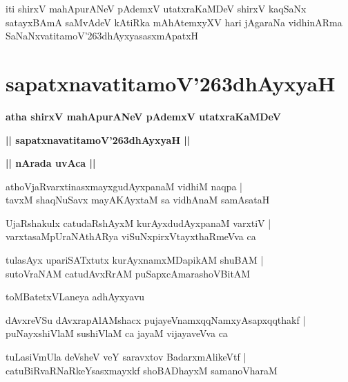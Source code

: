 \documentclass[twoside,12pt,openright]{book}
\def\S{\char'263}
\newcounter{shloka}[chapter]
\def\uvaca#1{\centerline{{\large\textbf{#1}}}}
\begin{document}
\begin{center}
iti shirxV mahApurANeV pAdemxV utatxraKaMDeV shirxV kaqSaNx satayxBAmA saMvAdeV kAtiRka mAhAtemxyXV 
hari jAgaraNa vidhinARma SaNaNxvatitamoV\S dhAyxyasasxmApatxH 
\end{center}

\chapter{sapatxnavatitamoV\S dhAyxyaH}

\begin{center}
{\LARGE\bfseries atha shirxV mahApurANeV pAdemxV utatxraKaMDeV}
\end{center}

\begin{center}
{\LARGE\bfseries || sapatxnavatitamoV\S dhAyxyaH || }
\end{center}

\uvaca{|| nArada uvAca ||}

\begin{shloka}%
athoVjaRvarxtinasxmayxgudAyxpanaM vidhiM naqpa |\\
tavxM shaqNuSavx mayAKAyxtaM sa vidhAnaM samAsataH 
\end{shloka}

\begin{shloka}%
UjaRshakulx catudaRshAyxM kurAyxdudAyxpanaM varxtiV |\\
varxtasaMpUraNAthARya viSuNxpirxVtayxthaRmeVva ca 
\end{shloka}

\begin{shloka}%
tulasAyx upariSATxtutx kurAyxnamxMDapikAM shuBAM |\\
sutoVraNAM catudAvxRrAM puSapxcAmarashoVBitAM 
\end{shloka}

\begin{center}
toMBatetxVLaneya adhAyxyavu
\end{center}

\begin{shloka}%
dAvxreVSu dAvxrapAlAMshacx pujayeVnamxqqNamxyAsapxqqthakf |\\
puNayxshiVlaM sushiVlaM ca jayaM vijayaveVva ca 
\end{shloka}

\begin{shloka}%
tuLasiVmUla deVsheV veY saravxtov BadarxmAlikeVtf |\\
catuBiRvaRNaRkeYsasxmayxkf shoBADhayxM samanoVharaM 
\end{shloka}
\end{document}
